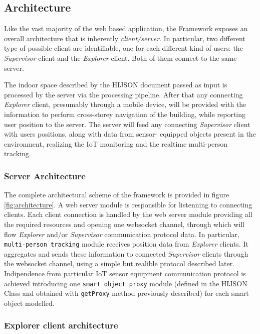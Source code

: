 \subsection{Architecture}\label{architecture}

Like the vast majority of the web based application, the Framework exposes an
overall architecture that is inherently \emph{client/server}. In particular,
two different type of possible client are identifiable, one for each different 
kind of users: the \emph{Supervisor} client and the \emph{Explorer} client. 
Both of them connect to the same server.

The indoor space described by the HIJSON document passed as input is
processed by the server via the processing pipeline. After that any connecting
\emph{Explorer} client, presumably through a mobile device, will be provided
with the information to perform cross-storey navigation of the building, while
reporting user position to the server. The server will feed any connecting
\emph{Supervisor} client with users positions, along with data from sensor-
equipped objects present in the environment, realizing the IoT monitoring and
the realtime multi-person tracking.

\subsubsection{Server Architecture}\label{server-architecture}

The complete architectural scheme of the framework is provided in figure
\ref{fig:architecture}. A web server module is responsible for listenning to
connecting clients. Each client connection is handled by the web server module
providing all the required resources and opening one websocket channel,
through which will flow \emph{Explorer} and/or \emph{Supervisor} communication
protocol data. In particular, {\tt multi-person\ tracking} module receives
position data from \emph{Explorer} clients. It aggregates and sends these
information to connected \emph{Supervisor} clients through the websocket
channel, using a simple but realible protocol described later. Indipendence
from particular IoT sensor equipment communication protocol is achieved
introducing one {\tt smart\ object\ proxy} module (defined in the HIJSON Class
and obtained with {\tt getProxy} method previously described) for each smart
object modelled.

\subsubsection{Explorer client architecture}\label{explorer-client-architecture}

